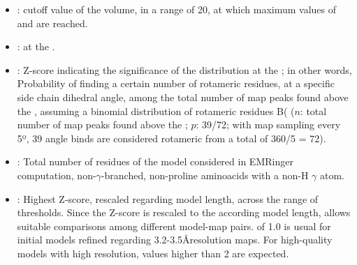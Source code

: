 \begin{itemize}
\begin{itemize}
\begin{itemize}
\begin{itemize}
          \item {}:  cutoff value of the volume, in a range of 20, at which maximum values of  and  are reached. 
          \item {}:  at the .
          \item {}: Z-score indicating the significance of the distribution at the ; in other words, Probability of finding a certain number of rotameric residues, at a specific side chain dihedral angle, among the total number of map peaks found above the , assuming a binomial distribution of rotameric residues B( ($n$: total number of map peaks found above the ; $p$: 39/72; with map sampling every 5º, 39 angle binds are considered rotameric from a total of 360/5 = 72).
          \item {}: Total number of residues of the model considered in EMRinger computation, non-$\gamma$-branched, non-proline aminoacids with a non-H $\gamma$ atom.
          \item {}: Highest Z-score, rescaled regarding model length, across the range of  thresholds. Since the Z-score is rescaled to the  according model length,  allows suitable comparisons among different model-map pairs.  of 1.0 is usual for initial models refined regarding 3.2-3.5\AA resolution maps. For high-quality models with high resolution,  values higher than 2 are expected.
         \end{itemize}


\end{itemize}
\end{itemize}
\end{itemize}
